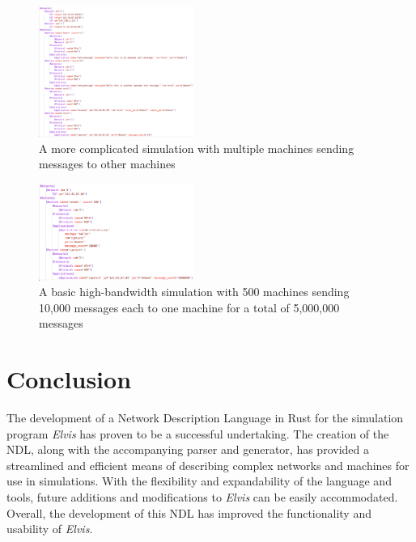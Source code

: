 \documentclass[journal]{IEEEtran} %
\newcommand{\imagewidth}{0.45\textwidth}
\newcommand{\elvis}{\textit{Elvis}}
\begin{document}
\begin{figure}[H]
    \centerline{\includegraphics[width=\imagewidth]{Images/fig5.png}}
    \caption{A more complicated simulation with multiple machines sending messages to other machines}
    \label{fig:compsim}
\end{figure}

\begin{figure}[H]
    \centerline{\includegraphics[width=\imagewidth]{Images/fig6.png}}
    \caption{A basic high-bandwidth simulation with 500 machines sending 10,000 messages each to one machine for a total of 5,000,000 messages}
    \label{fig:highband}
\end{figure}


\section{Conclusion}
The development of a Network Description Language in Rust for the simulation program \elvis{} has proven to be a successful undertaking. The creation of the NDL, along with the accompanying parser and generator, has provided a streamlined and efficient means of describing complex networks and machines for use in simulations. With the flexibility and expandability of the language and tools, future additions and modifications to \elvis{} can be easily accommodated. Overall, the development of this NDL has improved the functionality and usability of \elvis{}.
\end{document}

